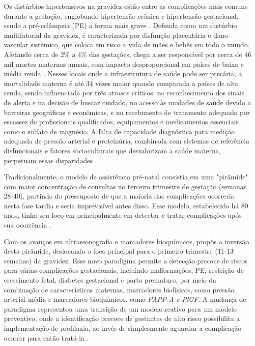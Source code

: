 \documentclass[12pt, a4paper]{report}
\theoremstyle{definition}
\theoremstyle{remark}
\theoremstyle{plain}
\begin{document}
Os distúrbios hipertensivos na gravidez estão entre as complicações mais comuns durante a gestação, englobando hipertensão crônica e hipertensão gestacional, sendo a pré-eclâmpsia (PE) a forma mais grave \cite{garovic2022}. Definida como um distúrbio multifatorial da gravidez, é caracterizada por disfunção placentária e dano vascular sistêmico, que coloca em risco a vida de mães e bebês em todo o mundo. Afetando cerca de 2\% a 4\% das gestações, chega a ser responsável por cerca de 46 mil mortes maternas anuais, com impacto desproporcional em países de baixa e média renda \cite{Magee2022_Preeclampsia}. Nesses locais onde a infraestrutura de saúde pode ser precária, a mortalidade materna é até 34 vezes maior quando comparada a países de alta renda, sendo influenciada por três atrasos críticos: no reconhecimento dos sinais de alerta e na decisão de buscar cuidado, no acesso às unidades de saúde devido a barreiras geográficas e econômicas, e no recebimento de tratamento adequado por escassez de profissionais qualificados, equipamentos e medicamentos essenciais como o sulfato de magnésio. A falta de capacidade diagnóstica para medição adequada de pressão arterial e proteinúria, combinada com sistemas de referência disfuncionais e fatores socioculturais que desvalorizam a saúde materna, perpetuam essas disparidades \cite{chappell2021}.

Tradicionalmente, o modelo de assistência pré-natal consistia em uma "pirâmide" com maior concentração de consultas no terceiro trimestre de gestação (semanas 28-40), partindo do pressuposto de que a maioria das complicações ocorreria nesta fase tardia e seria imprevisível antes disso. Esse modelo, estabelecido há 80 anos, tinha seu foco em principalmente em detectar e tratar complicações após sua ocorrência \cite{Nicolaides2011_PrenatalCarePyramid}.

Com os avanços em ultrassonografia e marcadores bioquímicos, \textcite{Nicolaides2011_PrenatalCarePyramid} propôs a inversão desta pirâmide, deslocando o foco principal para o primeiro trimestre (11-13 semanas) da gravidez. Esse novo paradigma permite a detecção precoce de riscos para várias complicações gestacionais, incluindo malformações, PE, restrição de crescimento fetal, diabetes gestacional e parto prematuro, por meio da combinação de características maternas, marcadores biofísicos, como pressão arterial média e marcadores bioquímicos, como \textit{PAPP-A e PlGF}. A mudança de paradigma representou uma transição de um modelo reativo para um modelo preventivo, onde a identificação precoce de gestantes de alto risco possibilita a implementação de profilaxia, ao invés de simplesmente aguardar a complicação ocorrer para então tratá-la \cite{SONEK2016305}.
\end{document}

